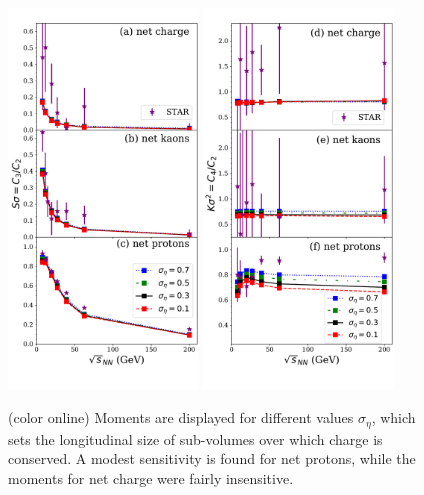 \begin{figure}
\centerline{\includegraphics[width=0.45\textwidth]{figs/bw_skewness_sigmaeta}\hspace{0.06\textwidth}
\includegraphics[width=0.45\textwidth]{figs/bw_kurtosis_sigmaeta}}
\caption{\label{fig:bw_vs_sigmaeta} (color online) Moments are displayed for different values $\sigma_\eta$, which sets the longitudinal size of sub-volumes over which charge is conserved. A modest sensitivity is found for net protons, while the moments for net charge were fairly insensitive.}
\end{figure}

